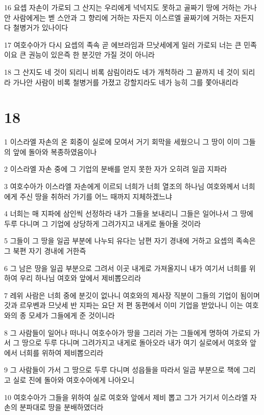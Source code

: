 \par 16 요셉 자손이 가로되 그 산지는 우리에게 넉넉지도 못하고 골짜기 땅에 거하는 가나안 사람에게는 벧 스안과 그 향리에 거하는 자든지 이스르엘 골짜기에 거하는 자든지 다 철병거가 있나이다
\par 17 여호수아가 다시 요셉의 족속 곧 에브라임과 므낫세에게 일러 가로되 너는 큰 민족이요 큰 권능이 있은즉 한 분깃만 가질 것이 아니라
\par 18 그 산지도 네 것이 되리니 비록 삼림이라도 네가 개척하라 그 끝까지 네 것이 되리라 가나안 사람이 비록 철병거를 가졌고 강할지라도 네가 능히 그를 쫓아내리라

\chapter{18}

\par 1 이스라엘 자손의 온 회중이 실로에 모여서 거기 회막을 세웠으니 그 땅이 이미 그들의 앞에 돌아와 복종하였음이나
\par 2 이스라엘 자손 중에 그 기업의 분배를 얻지 못한 자가 오히려 일곱 지파라
\par 3 여호수아가 이스라엘 자손에게 이르되 너희가 너희 열조의 하나님 여호와께서 너희에게 주신 땅을 취하러 가기를 어느 때까지 지체하겠느냐
\par 4 너희는 매 지파에 삼인씩 선정하라 내가 그들을 보내리니 그들은 일어나서 그 땅에 두루 다니며 그 기업에 상당하게 그려가지고 내게로 돌아올 것이라
\par 5 그들이 그 땅을 일곱 부분에 나누되 유다는 남편 자기 경내에 거하고 요셉의 족속은 그 북편 자기 경내에 거한즉
\par 6 그 남은 땅을 일곱 부분으로 그려서 이곳 내게로 가져올지니 내가 여기서 너희를 위하여 우리 하나님 여호와 앞에서 제비뽑으리라
\par 7 레위 사람은 너희 중에 분깃이 없나니 여호와의 제사장 직분이 그들의 기업이 됨이며 갓과 르우벤과 므낫세 반 지파는 요단 저 편 동편에서 이미 기업을 받았나니 이는 여호와의 종 모세가 그들에게 준 것이니라
\par 8 그 사람들이 일어나 떠나니 여호수아가 땅을 그리러 가는 그들에게 명하여 가로되 가서 그 땅으로 두루 다니며 그려가지고 내게로 돌아오라 내가 여기 실로에서 여호와 앞에서 너희를 위하여 제비뽑으리라
\par 9 그 사람들이 가서 그 땅으로 두루 다니며 성읍들을 따라서 일곱 부분으로 책에 그리고 실로 진에 돌아와 여호수아에게 나아오니
\par 10 여호수아가 그들을 위하여 실로 여호와 앞에서 제비 뽑고 그가 거기서 이스라엘 자손의 분파대로 땅을 분배하였더라
